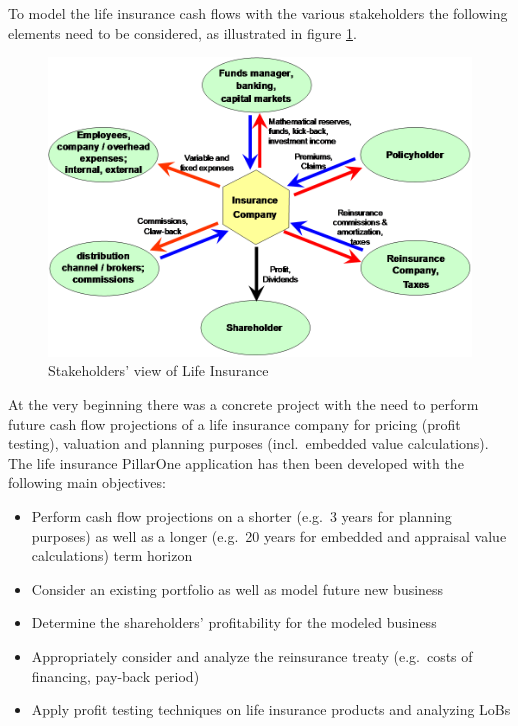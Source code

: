 To model the life insurance cash flows with the various stakeholders the following elements need to be considered, as illustrated in figure \ref{fig:lifehighlevel}.

\begin{figure}[ht]
\includegraphics[scale=0.7]{images/lifehighlevel.png}
	\caption{Stakeholders' view of Life Insurance}
	\label{fig:lifehighlevel}
\end{figure}


At the very beginning there was a concrete project with the need to perform future cash flow projections of a life insurance company for pricing (profit testing), valuation and planning purposes (incl.~embedded value calculations). The life insurance PillarOne application has then been developed with the following main objectives:

\begin{itemize}
	\item Perform cash flow projections on a shorter (e.g.~3 years for planning purposes) as well as a longer (e.g.~20 years for embedded and appraisal value calculations) term horizon
	\item Consider an existing portfolio as well as model future new business
	\item Determine the shareholders' profitability for the modeled business
	\item Appropriately consider and analyze the reinsurance treaty (e.g.~costs of financing, pay-back period)
	\item Apply profit testing techniques on life insurance products and analyzing LoBs
\end{itemize}

